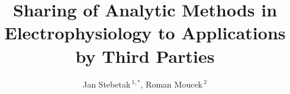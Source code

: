 \documentclass{frontiersSCNS} %
\def\firstAuthorLast{Sample {et~al.}} %
\def\Authors{Jan Stebetak\,$^{1,*}$, Roman Moucek\,$^{2}$}
\begin{document}
\onecolumn
{}

\title[Sharing of Analytic Methods in Electrophysiology to Applications by Third Parties]{Sharing of Analytic Methods in Electrophysiology to Applications by Third Parties} 

\author[\firstAuthorLast ]{\Authors} %
\address{} %
\correspondance{} %

\extraAuth{}%


\maketitle

\end{document}

